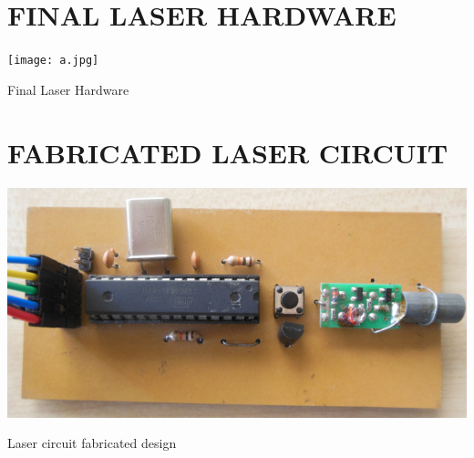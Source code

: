 \documentclass[12pt, a4paper]{article}
\begin{document}
\begin{appendices}
\section{FINAL LASER HARDWARE}
\begin{appendixfig}
\centering
\texttt{[image: a.jpg]}
\caption{Final Laser Hardware}
\label{}
\end{appendixfig}

\newpage
\section{FABRICATED LASER CIRCUIT}
\begin{appendixfig}
	\centering
	\includegraphics[scale=0.53]{front.png}
	\caption{Laser circuit fabricated design}
	\label{}
\end{appendixfig}
\newpage

\end{appendices}
\end{document}
